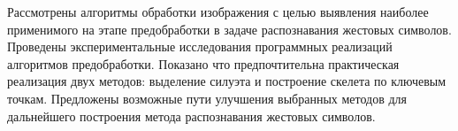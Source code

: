 Рассмотрены алгоритмы обработки изображения с целью выявления наиболее применимого на этапе предобработки в задаче распознавания жестовых символов. Проведены экспериментальные исследования программных реализаций алгоритмов предобработки. Показано что предпочтительна практическая реализация двух методов: выделение силуэта и построение скелета по ключевым точкам. Предложены возможные пути улучшения выбранных методов для дальнейшего построения метода распознавания жестовых символов.